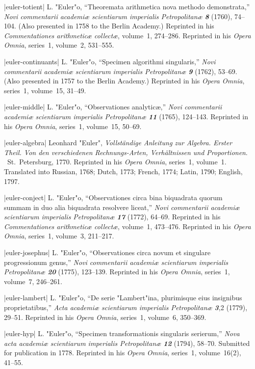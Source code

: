\bib|euler-totient|%
L. "Euler"o, ``Theoremata arithmetica nova methodo demonstrata,''
{\sl Novi commentarii academi{\ae} scientiarum imperialis Petropolitan{\ae}
\bf8} (1760), 74--104.
(Also presented in 1758 to the Berlin Academy.)
Reprinted in his {\sl Commentationes arithmetic{\ae} collect{\ae}},
volume~1, 274--286.
Reprinted in his {\sl Opera Omnia}, series~1, volume~2, 531--555.

\bib|euler-continuants|%
L. "Euler"o, ``Specimen algorithmi singularis,''
{\sl Novi commentarii academ\-i{\ae} scientiarum imperialis Petropolitan{\ae}
\bf9} (1762), 53--69.
(Also presented in 1757 to the Berlin Academy.)
Reprinted in his {\sl Opera Omnia}, series~1, volume~15, 31--49.

\bib|euler-middle|%
L. "Euler"o, ``Observationes analytic\ae,''
{\sl Novi commentarii academi{\ae} scientiarum imperialis
Petropolitan{\ae}
\bf11} (1765), 124--143.
Reprinted in his {\sl Opera Omnia}, series~1, volume~15, 50--69.

\bib|euler-algebra|%
Leonhard "Euler", {\sl Vollst\"andige Anleitung zur Algebra.
Erster Theil. Von den verschiedenen Rechnungs-Arten,
Verh\"altnissen und Proportionen}. \
St.~Petersburg, 1770.
Reprinted in his {\sl Opera Omnia}, series~1, volume~1.
Translated into Russian, 1768;
Dutch, 1773; French, 1774; Latin, 1790; English, 1797.

\bib|euler-conject|%
L. "Euler"o, ``Observationes circa bina biquadrata quorum summam in duo
alia biquadrata resolvere liceat,''
{\sl Novi commentarii academi{\ae} scientiarum imperialis Petropolitan{\ae}
\bf17} (1772), 64--69.
Reprinted in his {\sl Commentationes arithmetic{\ae} collect{\ae}},
volume~1, 473--476.
Reprinted in his {\sl Opera Omnia}, series~1, volume~3, 211--217.

\bib|euler-josephus|%
L. "Euler"o, ``Observationes circa novum et singulare progressionum
genus,''
{\sl Novi commentarii academi{\ae} scientiarum imperialis Petropolitan{\ae}
\bf20} (1775), 123--139.
Reprinted in his {\sl Opera Omnia}, series~1, volume~7, 246--261.

\bib|euler-lambert|%
L. "Euler"o, ``De serie "Lambert"ina, plurimisque eius insignibus
proprietatibus,'' {\sl Acta academi{\ae} scientiarum imperialis
Petropolitan{\ae}\/ \bf3},2 (1779), 29--51.
Reprinted in his {\sl Opera Omnia}, series~1, volume~6, 350--369.

\bib|euler-hyp|%
L. "Euler"o, ``Specimen transformationis singularis serierum,''
{\sl Nova acta academi{\ae} scientiarum imperialis Petropolitan{\ae}
\bf12} (1794), 58--70.
Submitted for publication in 1778.
Reprinted in his {\sl Opera Omnia}, series~1, volume~16(2), 41--55.

